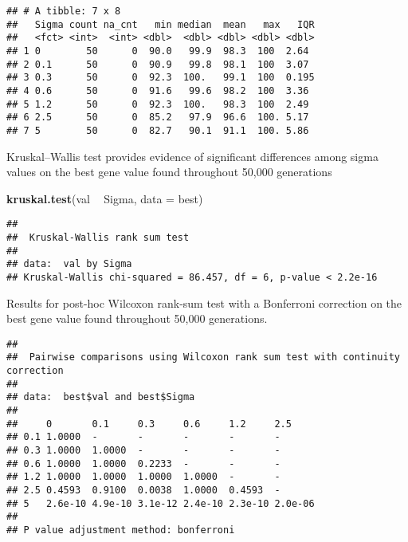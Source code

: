 \documentclass[]{book}
\newenvironment{Shaded}{\begin{snugshade}}{\end{snugshade}}
\newcommand{\DataTypeTok}[1]{\textcolor[rgb]{0.13,0.29,0.53}{#1}}
\newcommand{\KeywordTok}[1]{\textcolor[rgb]{0.13,0.29,0.53}{\textbf{#1}}}
\newcommand{\NormalTok}[1]{#1}
\newcommand{\OperatorTok}[1]{\textcolor[rgb]{0.81,0.36,0.00}{\textbf{#1}}}
\newcommand{\OtherTok}[1]{\textcolor[rgb]{0.56,0.35,0.01}{#1}}
\newcommand{\StringTok}[1]{\textcolor[rgb]{0.31,0.60,0.02}{#1}}
\begin{document}
\begin{verbatim}
## # A tibble: 7 x 8
##   Sigma count na_cnt   min median  mean   max   IQR
##   <fct> <int>  <int> <dbl>  <dbl> <dbl> <dbl> <dbl>
## 1 0        50      0  90.0   99.9  98.3  100  2.64 
## 2 0.1      50      0  90.9   99.8  98.1  100  3.07 
## 3 0.3      50      0  92.3  100.   99.1  100  0.195
## 4 0.6      50      0  91.6   99.6  98.2  100  3.36 
## 5 1.2      50      0  92.3  100.   98.3  100  2.49 
## 6 2.5      50      0  85.2   97.9  96.6  100. 5.17 
## 7 5        50      0  82.7   90.1  91.1  100. 5.86
\end{verbatim}

Kruskal--Wallis test provides evidence of significant differences among sigma values on the best gene value found throughout 50,000 generations

\begin{Shaded}
\begin{Highlighting}[]
\KeywordTok{kruskal.test}\NormalTok{(val }\OperatorTok{~}\StringTok{ }\NormalTok{Sigma, }\DataTypeTok{data =}\NormalTok{ best)}
\end{Highlighting}
\end{Shaded}

\begin{verbatim}
## 
##  Kruskal-Wallis rank sum test
## 
## data:  val by Sigma
## Kruskal-Wallis chi-squared = 86.457, df = 6, p-value < 2.2e-16
\end{verbatim}

Results for post-hoc Wilcoxon rank-sum test with a Bonferroni correction on the best gene value found throughout 50,000 generations.

\begin{Shaded}
\end{Shaded}

\begin{verbatim}
## 
##  Pairwise comparisons using Wilcoxon rank sum test with continuity correction 
## 
## data:  best$val and best$Sigma 
## 
##     0       0.1     0.3     0.6     1.2     2.5    
## 0.1 1.0000  -       -       -       -       -      
## 0.3 1.0000  1.0000  -       -       -       -      
## 0.6 1.0000  1.0000  0.2233  -       -       -      
## 1.2 1.0000  1.0000  1.0000  1.0000  -       -      
## 2.5 0.4593  0.9100  0.0038  1.0000  0.4593  -      
## 5   2.6e-10 4.9e-10 3.1e-12 2.4e-10 2.3e-10 2.0e-06
## 
## P value adjustment method: bonferroni
\end{verbatim}
\end{document}
